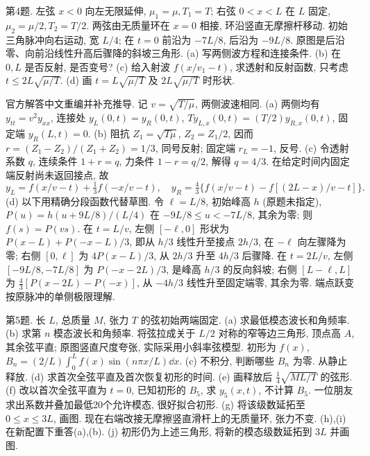 \begin{exercise}\label{exam:e2.4}
第4题. 左弦 $x<0$ 向左无限延伸, $\mu_1=\mu,T_1=T$; 右弦 $0<x<L$ 在 $L$ 固定, $\mu_2=\mu/2,T_2=T/2$. 两弦由无质量环在 $x=0$ 相接, 环沿竖直无摩擦杆移动. 初始三角脉冲向右运动, 宽 $L/4$; 在 $t=0$ 前沿为 $-7L/8$, 后沿为 $-9L/8$. 原图是后沿零、向前沿线性升高后骤降的斜坡三角形. (a) 写两侧波方程和连接条件. (b) 在 $0,L$ 是否反射, 是否变号? (c) 给入射波 $f(x/v_1-t)$, 求透射和反射函数, 只考虑 $t\le2L\sqrt{\mu/T}$. (d) 画 $t=L\sqrt{\mu/T}$ 及 $2L\sqrt{\mu/T}$ 时形状.
\end{exercise}
\begin{solution}
官方解答中文重编并补充推导. 记 $v=\sqrt{T/\mu}$, 两侧波速相同. (a) 两侧均有 $y_{tt}=v^2y_{xx}$, 连接处 $y_L(0,t)=y_R(0,t)$, $Ty_{L,x}(0,t)=(T/2)y_{R,x}(0,t)$, 固定端 $y_R(L,t)=0$.
(b) 阻抗 $Z_1=\sqrt{T\mu}$, $Z_2=Z_1/2$, 因而 $r=(Z_1-Z_2)/(Z_1+Z_2)=1/3$, 同号反射; 固定端 $r_L=-1$, 反号.
(c) 令透射系数 $q$, 连续条件 $1+r=q$, 力条件 $1-r=q/2$, 解得 $q=4/3$. 在给定时间内固定端反射尚未返回接点, 故
\[
y_L=f(x/v-t)+\tfrac13f(-x/v-t),\quad
y_R=\tfrac43\{f(x/v-t)-f[(2L-x)/v-t]\}.
\]
(d) 以下用精确分段函数代替草图. 令 $\ell=L/8$, 初始峰高 $h$ (原题未指定), $P(u)=h(u+9L/8)/(L/4)$ 在 $-9L/8\le u<-7L/8$, 其余为零; 则 $f(s)=P(vs)$. 在 $t=L/v$, 左侧 $[-\ell,0]$ 形状为 $P(x-L)+P(-x-L)/3$, 即从 $h/3$ 线性升至接点 $2h/3$, 在 $-\ell$ 向左骤降为零; 右侧 $[0,\ell]$ 为 $4P(x-L)/3$, 从 $2h/3$ 升至 $4h/3$ 后骤降. 在 $t=2L/v$, 左侧 $[-9L/8,-7L/8]$ 为 $P(-x-2L)/3$, 是峰高 $h/3$ 的反向斜坡; 右侧 $[L-\ell,L]$ 为 $\tfrac43[P(x-2L)-P(-x)]$, 从 $-4h/3$ 线性升至固定端零, 其余为零. 端点跃变按原脉冲的单侧极限理解.
\end{solution}
\begin{exercise}\label{exam:e2.5}
第5题. 长 $L$, 总质量 $M$, 张力 $T$ 的弦初始两端固定. (a) 求最低模态波长和角频率. (b) 求第 $n$ 模态波长和角频率. 将弦拉成关于 $L/2$ 对称的窄等边三角形, 顶点高 $A$, 其余弦平直; 原图竖直尺度夸张, 实际采用小斜率弦模型. 初形为 $f(x)$, $B_n=(2/L)\int_0^Lf(x)\sin(n\pi x/L)\dd x$. (c) 不积分, 判断哪些 $B_n$ 为零. 从静止释放. (d) 求首次全弦平直及首次恢复初形的时间. (e) 画释放后 $\tfrac14\sqrt{ML/T}$ 的弦形. (f) 改以首次全弦平直为 $t=0$, 已知初形的 $B_5$, 求 $y_5(x,t)$, 不计算 $B_5$. 一位朋友求出系数并叠加最低20个允许模态, 很好拟合初形. (g) 将该级数延拓至 $0\le x\le3L$, 画图. 现在右端改接无摩擦竖直滑杆上的无质量环, 张力不变. (h),(i) 在新配置下重答(a),(b). (j) 初形仍为上述三角形, 将新的模态级数延拓到 $3L$ 并画图.
\end{exercise}
